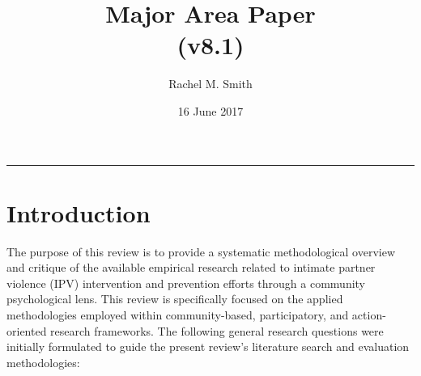 \documentclass[11pt,]{tufte-book}
\title{Major Area Paper\\
(v8.1)}
\author{Rachel M. Smith}
\date{16 June 2017}
\newcommand{\Frule}{
    \vspace*{-1em}
    \begin{fullwidth}\textcolor{blublk}{\rule{\linewidth}{0.2mm}}\end{fullwidth}
}
\begin{document}
\maketitle



{
\setcounter{tocdepth}{1}
\tableofcontents
}

\makeatletter
\def\LT@makenoprefixcaption#1#2#3{%
  \LT@mcol\LT@cols c{\hbox to\z@{\hss\parbox[t]\LTcapwidth{
    \sbox\@tempboxa{#1{}#3}
    \ifdim\wd\@tempboxa>\hsize
      #1{}#3
    \else
      \hbox to\hsize{\hfil\box\@tempboxa\hfil}%
    \fi
    \endgraf\vskip\baselineskip}
  \hss}}}
\makeatother

\makeatletter
\let\LT@oldmakecaption=\LT@makecaption
\let\oldthetable=\thetable
\let\oldtheHtable=\theHtable
\makeatother

\makeatletter
{}
\newenvironment{no-prefix-table-caption}{
  \let\LT@makecaption=\LT@makenoprefixcaption
  \renewcommand\thetable{x.\thetableno}
  \renewcommand\theHtable{x.\thetableno}
  \stepcounter{tableno}
}{
  \let\thetable=\oldthetable
  \let\theHtable=\oldtheHtable
  \let\LT@makecaption=\LT@oldmakecaption
  \addtocounter{table}{-1}
}
\makeatother

\newcommand{\plusnamesingular}{}
\newcommand{\starnamesingular}{}
\newcommand{\xrefname}[1]{\protect\renewcommand{\plusnamesingular}{#1}}
\newcommand{\Xrefname}[1]{\protect\renewcommand{\starnamesingular}{#1}}
\providecommand{\cref}{\plusnamesingular~\ref}
\providecommand{\Cref}{\starnamesingular~\ref}
\providecommand{\crefformat}[2]{}
\providecommand{\Crefformat}[2]{}

\crefformat{table}{Table~#2#1#3}
\Crefformat{table}{Table~#2#1#3}
\crefformat{figure}{Figure~#2#1#3}
\Crefformat{figure}{Figure~#2#1#3}

\Frule

\chapter{Introduction}\label{introduction}

The purpose of this review is to provide a systematic methodological
overview and critique of the available empirical research related to
intimate partner violence (IPV) intervention and prevention efforts
through a community psychological lens. This review is specifically
focused on the applied methodologies employed within community-based,
participatory, and action-oriented research frameworks. The following
general research questions were initially formulated to guide the
present review's literature search and evaluation methodologies:
\end{document}
